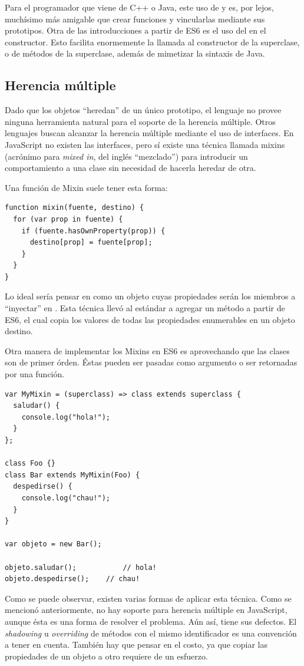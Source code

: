 Para el programador que viene de C++ o Java, este uso de  y  es, por lejos, muchísimo más amigable que crear funciones y vincularlas mediante sus prototipos. Otra de las introducciones a partir de ES6 es el uso del  en el constructor. Esto facilita enormemente la llamada al constructor de la superclase, o de métodos de la superclase, además de mimetizar la sintaxis de Java. 

\subsection{Herencia múltiple}

Dado que los objetos "`heredan"' de un único prototipo, el lenguaje no provee ninguna herramienta natural para el soporte de la herencia múltiple. Otros lenguajes buscan alcanzar la herencia múltiple mediante el uso de interfaces. En JavaScript no existen las interfaces, pero sí existe una técnica llamada mixins (acrónimo para \textit{mixed in}, del inglés "`mezclado"') para introducir un comportamiento a una clase sin necesidad de hacerla heredar de otra.

Una función de Mixin suele tener esta forma:

\begin{lstlisting}[title={Función de Mixin}]
function mixin(fuente, destino) {  
  for (var prop in fuente) {
    if (fuente.hasOwnProperty(prop)) {
      destino[prop] = fuente[prop];
    }
  }
}
\end{lstlisting}

Lo ideal sería pensar en  como un objeto cuyas propiedades serán los miembros a "`inyectar"' en . Esta técnica llevó al estándar a agregar un método  a partir de ES6, el cual copia los valores de todas las propiedades enumerables en un objeto destino.

Otra manera de implementar los Mixins en ES6 es aprovechando que las clases son de primer órden. Éstas pueden ser pasadas como argumento o ser retornadas por una función.

\begin{lstlisting}[title={Haciendo uso de \code{class} como expresión}]
var MyMixin = (superclass) => class extends superclass {  
  saludar() {
    console.log("hola!");
  }
};

class Foo {}
class Bar extends MyMixin(Foo) {
  despedirse() {
    console.log("chau!");
  }
}

var objeto = new Bar();

objeto.saludar();			// hola!
objeto.despedirse();	// chau!
\end{lstlisting}

Como se puede observar, existen varias formas de aplicar esta técnica. Como se mencionó anteriormente, no hay soporte para herencia múltiple en JavaScript, aunque ésta es una forma de resolver el problema. Aún así, tiene sus defectos. El \textit{shadowing} u \textit{overriding} de métodos con el mismo identificador es una convención a tener en cuenta. También hay que pensar en el costo, ya que copiar las propiedades de un objeto a otro requiere de un esfuerzo.
